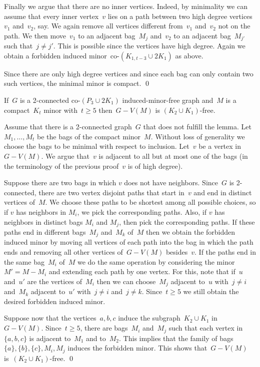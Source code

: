 \documentclass[envcountsame,envcountsect,11pt,a4paper]{llncs}
\renewenvironment{proof}{\begin{Proof}}{\qed\end{Proof}}
\begin{document}
\begin{proof}
Finally we argue that there are no inner vertices. Indeed, by minimality we can assume that every inner vertex~$v$ lies on a path between two high degree vertices~$v_1$ and~$v_2$, say. We again remove all vertices different from~$v_1$ and~$v_2$ not on the path. We then move~$v_1$ to an adjacent bag~$M_j$ and~$v_2$ to an adjacent bag~$M_{j'}$ such that~$j\neq j'$. This is possible since the vertices have high degree. Again we obtain a forbidden induced minor~co-$(K_{1,t-3} \cup 2 K_{1})$ as above.

Since there are only high degree vertices and since each bag can only contain two such vertices, the minimal minor is compact.
\end{proof}

\begin{lemma}
\label{lem:bicon:aug:co:graph}
If~$G$ is a 2-connected co-$(P_{3} \cup 2 K_{1})$ induced-minor-free graph and~$M$ is a compact~$K_t$ minor with~$t\geq 5$ then~$G-V(M)$ is $(K_{2} \cup K_{1})$-free. 
\end{lemma}
\begin{proof}
Assume that there is a 2-connected graph~$G$ that does not fulfill the lemma.
Let~$M_1,\ldots,M_t$ be the bags of the compact minor~$M$. Without loss of generality we choose the bags to be minimal with respect to inclusion.
Let~$v$ be a vertex in~$G-V(M)$. We argue that~$v$ is adjacent to all but at most one of the bags (in the terminology of the previous proof~$v$ is of high degree).

Suppose there are two bags in which $v$ does not have neighbors.
Since~$G$ is 2-connected, there are two vertex disjoint paths that start in~$v$ and end in distinct vertices of~$M$. We choose these paths to be
shortest among all possible choices, so if $v$ has neighbors in $M_i$, we pick the corresponding paths. Also, if $v$ has neighbors in
distinct bags $M_i$ and $M_j$, then pick the corresponding paths.
If these paths end in different bags~$M_j$ and~$M_k$ of~$M$ then we obtain the forbidden induced minor by moving all
vertices of each path into the bag in which the path ends and removing all other vertices of~$G-V(M)$ besides~$v$. If the paths end in the same
bag~$M_i$ of~$M$ we do the same operation by considering the minor~$M' = M-M_i$ and extending each path by one vertex. For this, note that
if~$u$ and~$u'$ are the vertices of~$M_i$ then we can choose~$M_j$ adjacent to~$u$ with~$j\neq i$ and~$M_k$ adjacent to~$u'$ with~$j\neq i$
and~$j\neq k$.
Since~$t\geq 5$ we still obtain the desired forbidden induced minor.

Suppose now that the vertices~$a,b,c$ induce the subgraph~$K_{2} \cup K_{1}$ in~$G-V(M)$.
Since~$t\geq 5$, there are bags~$M_{i}$ and~$M_{j}$ such that each vertex in~$\{a,b,c\}$ is adjacent to~$M_1$ and to~$M_2$. This implies that the family of bags~$\{a\}, \{b\}, \{c\},M_i, M_j$ induces the forbidden minor. This shows that~$G-V(M)$ is~$(K_{2} \cup K_{1})$-free.
\end{proof}
\end{document}
